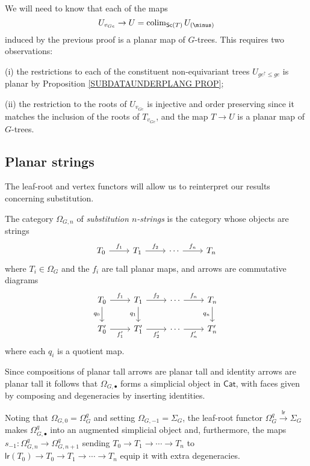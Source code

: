 \documentclass[a4paper,10pt]{article}%
\begin{document}
\begin{remark} We will need to know that each of the maps 
\[U_{v_{Ge}} \to U = \colim_{\mathsf{Sc}(T)}U_{(\minus)}\]
induced by the previous proof is a planar map of $G$-trees.
This requires two observations:
\begin{inparaenum}
	\item[(i)] the restrictions to each of the constituent non-equivariant trees $U_{ge^{\uparrow}\leq ge}$ is planar by Proposition \ref{SUBDATAUNDERPLANG PROP};
	\item[(ii)] the restriction to the roots of $U_{v_{Ge}}$ is injective and order preserving since it matches the inclusion of the roots of $T_{v_{Ge}}$, and the map $T \to U$ is a planar map of $G$-trees.
\end{inparaenum}
\end{remark}



\subsection{Planar strings}\label{PLANARSTRING SEC}

The leaf-root and vertex functors will allow us to reinterpret our results concerning substitution.

\begin{definition}
	The category $\Omega_{G,n}$ of 
	\textit{substitution $n$-strings} is the category whose objects are strings
	\[
	\begin{tikzcd}
	T_0 \ar{r}{f_1} & T_1 \ar{r}{f_2} & \cdots \ar{r}{f_n} & T_n
	\end{tikzcd}	
	\]
	where $T_i \in \Omega_G$ and the $f_i$ are tall planar maps, and arrows are commutative diagrams 
	\begin{equation} \label{PTNARROW EQ}
	\begin{tikzcd}
	T_0 \ar{r}{f_1} \ar{d}[swap]{q_0} & T_1 \ar{r}{f_2} \ar{d}[swap]{q_1} & \cdots \ar{r}{f_n} & T_n \ar{d}[swap]{q_n}
\\
	T'_0 \ar{r}[swap]{f'_1} & T'_1 \ar{r}[swap]{f'_2} & \cdots \ar{r}[swap]{f'_n} & T'_n
	\end{tikzcd}	
	\end{equation}
where each $q_i$ is a quotient map.
\end{definition}


\begin{notation}\label{SIMPOPERATORS NOT}
	Since compositions of planar tall arrows are planar tall
	and identity arrows are planar tall	
	it follows that 
	$\Omega_{G,\bullet}$
	forms a simplicial object in $\mathsf{Cat}$, 
	with faces given by composing and degeneracies by inserting identities. 

	Noting that $\Omega_{G,0} = \Omega_G^q$ and setting 
	$\Omega_{G,-1} = \Sigma_G$, the leaf-root functor $\Omega_G^q \xrightarrow{\mathsf{lr}} \Sigma_G$ makes 
	$\Omega_{G,\bullet}^q$ into an augmented simplicial object and, furthermore, the maps 
	$s_{-1} \colon \Omega_{G,n}^q \to \Omega_{G,n+1}^q$
sending $T_0 \to T_1 \to \cdots \to T_n$ to 
$\mathsf{lr}(T_0) \to T_0 \to T_1 \to \cdots \to T_n$ equip it with extra degeneracies.
\end{notation}
\end{document}
